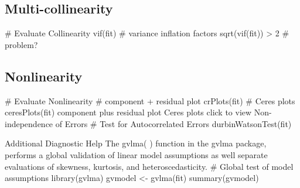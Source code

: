 \subsection*{Multi-collinearity}
# Evaluate Collinearity
vif(fit) # variance inflation factors 
sqrt(vif(fit)) > 2 # problem?

\subsection*{Nonlinearity}
# Evaluate Nonlinearity
# component + residual plot 
crPlots(fit)
# Ceres plots 
ceresPlots(fit)
component plus residual plot Ceres plots click to view
Non-independence of Errors
# Test for Autocorrelated Errors
durbinWatsonTest(fit)

Additional Diagnostic Help
The gvlma( ) function in the gvlma package, performs a global validation of linear model assumptions as well separate evaluations of skewness, kurtosis, and heteroscedasticity.
# Global test of model assumptions
library(gvlma)
gvmodel <- gvlma(fit) 
summary(gvmodel)
